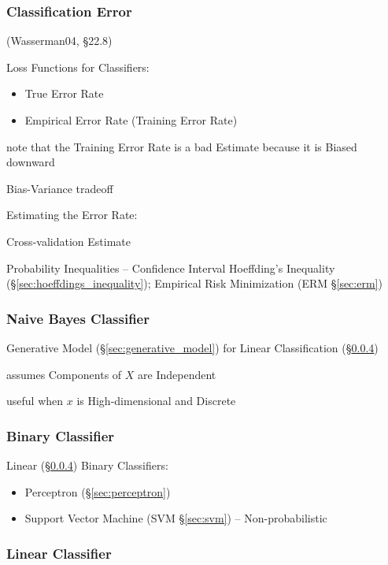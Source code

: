 \subsubsection{Classification Error}\label{sec:classification_error}

(Wasserman04, \S22.8)

Loss Functions for Classifiers:
\begin{itemize}
  \item True Error Rate
  \item Empirical Error Rate (Training Error Rate)
\end{itemize}

note that the Training Error Rate is a bad Estimate because it is Biased
downward

Bias-Variance tradeoff

Estimating the Error Rate:

Cross-validation Estimate

Probability Inequalities -- Confidence Interval \fist Hoeffding's Inequality
(\S\ref{sec:hoeffdings_inequality}); Empirical Risk Minimization (ERM
\S\ref{sec:erm})



\subsubsection{Naive Bayes Classifier}\label{sec:naive_bayes}

Generative Model (\S\ref{sec:generative_model}) for Linear Classification
(\S\ref{sec:linear_classifier})

assumes Components of $X$ are Independent

useful when $x$ is High-dimensional and Discrete



\subsubsection{Binary Classifier}\label{sec:binary_classifier}

Linear (\S\ref{sec:linear_classifier}) Binary Classifiers:
\begin{itemize}
  \item Perceptron (\S\ref{sec:perceptron})
  \item Support Vector Machine (SVM \S\ref{sec:svm}) -- Non-probabilistic
\end{itemize}



\subsubsection{Linear Classifier}\label{sec:linear_classifier}

